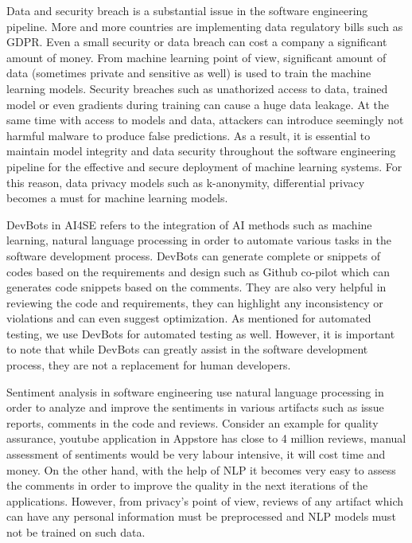 \documentclass{article}
\begin{document}
Data and security breach is a substantial issue in the software engineering pipeline. More and more countries are implementing data regulatory bills such as GDPR. Even a small security or data breach can cost a company a significant amount of money. From machine learning point of view, significant amount of data (sometimes private and sensitive as well) is used to train the machine learning models. Security breaches such as unathorized access to data, trained model or even gradients during training can cause a huge data leakage. At the same time with access to models and data, attackers can introduce seemingly not harmful malware to produce false predictions. As a result, it is essential to maintain model integrity and data security throughout the software engineering pipeline for the effective and secure deployment of machine learning systems. For this reason, data privacy models such as k-anonymity, differential privacy becomes a must for machine learning models. 

DevBots in AI4SE refers to the integration of AI methods such as machine learning, natural language processing in order to automate various tasks in the software development process. DevBots can generate complete or snippets of codes based on the requirements and design such as Github co-pilot which can generates code snippets based on the comments. They are also very helpful in reviewing the code and requirements, they can highlight any inconsistency or violations and can even suggest optimization. As mentioned for automated testing, we use DevBots for automated testing as well. However, it is important to note that while DevBots can greatly assist in the software development process, they are not a replacement for human developers.

Sentiment analysis in software engineering use natural language processing in order to analyze and improve the sentiments in various artifacts such as issue reports, comments in the code and reviews. Consider an example for quality assurance, youtube application in Appstore has close to 4 million reviews, manual assessment of sentiments would be very labour intensive, it will cost time and money. On the other hand, with the help of NLP it becomes very easy to assess the comments in order to improve the quality in the next iterations of the applications. However, from privacy's point of view, reviews of any artifact which can have any personal information must be preprocessed and NLP models must not be trained on such data.
\end{document}
